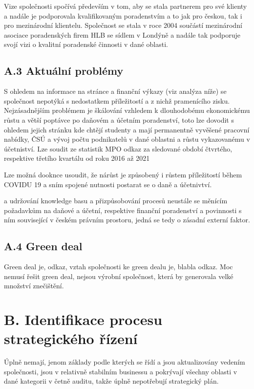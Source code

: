Vize společnosti spočívá především v tom, aby se stala partnerem pro své klienty a nadále je podporovala kvalifikovaným poradenstvím a to jak pro českou, tak i pro mezinárodní klientelu. Společnost se stala v roce 2004 součástí mezinárodní asociace poradenských firem HLB se sídlem v Londýně a nadále tak podporuje svojí vizi o kvalitní poradenské činnosti v dané oblasti.

\subsection*{A.3 Aktuální problémy}

S ohledem na informace na stránce a finanční výkazy (viz analýza níže) se společnost nepotýká s nedostatkem příležitostí a z nichž pramenícího zisku. Nejzásadnějším problémem je škálování vzhledem k dlouhodobému ekonomickému růstu a větší poptávce po daňovém a účetním poradenství, toto lze dovodit s ohledem jejich stránku kde chtějí studenty a mají permanentně vyvěšené pracovní nabídky, ČSÚ a vývoj počtu podnikatelů v dané oblastni a růstu vykazovanému v účetniství. Lze soudit ze statistik MPO odkaz za sledované období čtvrtého, respektive třetího kvartálu od roku 2016 až 2021



Lze možná dooknce usoudit, že nárůst je způsobený i růstem příležitostí během COVIDU 19 a sním spojené nutnosti postarat se o daně a účetnivtví.


 a udržování knowledge basu a přizpůsobování procesů neustále se měnícím požadavkům na daňové a účetní, respektive finanční poradenství a povinnosti s ním související v českém právním prostoru, jedná se tedy o zásadní externí faktor.

\subsection*{A.4 Green deal}

Green deal je, odkaz, vztah společnosti ke green dealu je, blabla odkaz. Moc nemusí řešit green deal, nejsou výrobní společnost, která by generovala velké množství znečištění.

\section*{B. Identifikace procesu strategického řízení}

Úplně nemají, jenom základy podle kterých se řídí a jsou aktualizovány vedením společnosti, jsou v relativně stabilním businessu a pokrývají všechny oblasti v dané kategorii v četně auditu, takže úplně nepotřebují strategický plán.

